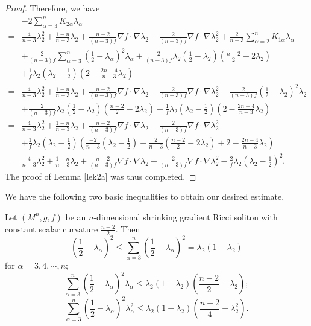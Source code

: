 \documentclass[12pt]{amsart}
\begin{document}
\begin{proof}
Therefore, we have
\begin{equation*}
	\begin{aligned}
		&-2\sum_{\alpha=3}^nK_{2\alpha}\lambda_\alpha\\
	=&\frac{4}{n-3}\lambda_2^2+\frac{1-n}{n-3}\lambda_2+\frac{n-2}{(n-3)f}\nabla f\cdot \nabla \lambda_2-\frac{2}{(n-3)f}\nabla f\cdot \nabla \lambda_2^2+\frac{2}{n-3}\sum_{\alpha=2}^nK_{1\alpha}\lambda_\alpha\\
		&+\frac{2}{(n-3)f}\sum_{\alpha=3}^n({\frac{1}{2}}-\lambda_{\alpha})^2\lambda_{\alpha}	 +\frac{2}{(n-3)f}\lambda_2(\frac{1}{2}-\lambda_2)({\frac{n-2}{2}}-2\lambda_{2})\\
		&+\frac{1}{f}\lambda_2(\lambda_2-\frac{1}{2})(2-\frac{2n-4}{n-3}\lambda_2)\\
=&\frac{4}{n-3}\lambda_2^2+\frac{1-n}{n-3}\lambda_2+\frac{n-2}{(n-3)f}\nabla f\cdot \nabla \lambda_2-\frac{2}{(n-3)f}\nabla f\cdot \nabla \lambda_2^2-\frac{2}{(n-3)f}({\frac{1}{2}}-\lambda_2)^2\lambda_2\\
 &+	\frac{2}{(n-3)f}\lambda_2(\frac{1}{2}-\lambda_2)({\frac{n-2}{2}}-2\lambda_{2})
		+\frac{1}{f}\lambda_2(\lambda_2-\frac{1}{2})(2-\frac{2n-4}{n-3}\lambda_2)\\
=&\frac{4}{n-3}\lambda_2^2+\frac{1-n}{n-3}\lambda_2+\frac{n-2}{(n-3)f}\nabla f\cdot \nabla \lambda_2-\frac{2}{(n-3)f}\nabla f\cdot \nabla \lambda_2^2\\
&+\frac{1}{f}\lambda_2(\lambda_2-\frac{1}{2})\left( \frac{-2}{n-3}(\lambda_2-\frac{1}{2})-\frac{2}{n-3}(\frac{n-2}{2}-2\lambda_2)+2-\frac{2n-4}{n-3}\lambda_2\right)\\
=&\frac{4}{n-3}\lambda_2^2+\frac{1-n}{n-3}\lambda_2+\frac{n-2}{(n-3)f}\nabla f\cdot \nabla \lambda_2-\frac{2}{(n-3)f}\nabla f\cdot \nabla \lambda_2^2-\frac{2}{f}\lambda_2(\lambda_2-\frac{1}{2})^2.
	\end{aligned}
\end{equation*}
The proof of Lemma \ref{lek2a} was thus completed.
\end{proof}
	
	We have the following two basic inequalities to obtain our desired estimate.
	\begin{lem}
		Let $(M^n, g, f)$ be an $n$-dimensional shrinking gradient Ricci soliton with constant scalar curvature $\frac{n-2}{2}$. Then
		\begin{equation} \label{la}
		(\frac{1}{2}-\lambda_\alpha)^2\leq\sum_{\alpha=3}^n(\frac{1}{2}-\lambda_\alpha)^2=\lambda_2(1-\lambda_2)
		\end{equation}
		for $\alpha=3,4,\cdots, n$;
		\begin{equation}\label{l345}
		\sum_{\alpha=3}^n(\frac{1}{2}-\lambda_\alpha)^2\lambda_\alpha\leq\lambda_2(1-\lambda_2)(\frac{n-2}{2}-\lambda_2);
		\end{equation}
		\begin{equation}\label{l345'}
		\sum_{\alpha=3}^n(\frac{1}{2}-\lambda_\alpha)^2\lambda_\alpha^2\leq\lambda_2(1-\lambda_2)(\frac{n-2}{4}-\lambda_2^2).
		\end{equation}
	\end{lem}
	
\end{document}
